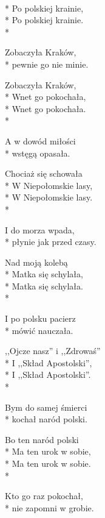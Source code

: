 \begin{lyrics}[multicol=true,longestline={,,Ojcze nasz'' i ,,Zdrowaś''}]

\\*
Po polskiej krainie,\\*
Po polskiej krainie.\\*
\begin{markverses}[atwidthof={Zobaczyła Krakówmm}]%
Zobaczyła Kraków,\\*
pewnie go nie minie.
\end{markverses}

Zobaczyła Kraków,\\*
Wnet go pokochała,\\*
Wnet go pokochała.\\*
\begin{markverses}[atwidthof={Zobaczyła Krakówmm}]%
A w dowód miłości\\*
wstęgą opasała.
\end{markverses}

Chociaż się schowała\\*
W Niepołomskie lasy,\\*
W Niepołomskie lasy.\\*
\begin{markverses}[atwidthof={Zobaczyła Krakówmm}]%
I do morza wpada,\\*
płynie jak przed czasy.
\end{markverses}

Nad moją kolebą\\*
Matka się schylała,\\*
Matka się schylała.\\*
\begin{markverses}[atwidthof={Zobaczyła Krakówmm}]%
I po polsku pacierz\\*
mówić nauczała.
\end{markverses}

,,Ojcze nasz'' i ,,Zdrowaś''\\*
I ,,Skład Apostolski'',\\*
I ,,Skład Apostolski''.\\*
\begin{markverses}[atwidthof={Zobaczyła Krakówmm}]%
Bym do samej śmierci\\*
kochał naród polski.
\end{markverses}

Bo ten naród polski\\*
Ma ten urok w sobie,\\*
Ma ten urok w sobie.\\*
\begin{markverses}[atwidthof={Zobaczyła Krakówmm}]%
Kto go raz pokochał,\\*
nie zapomni w grobie.
\end{markverses}


\end{lyrics}
